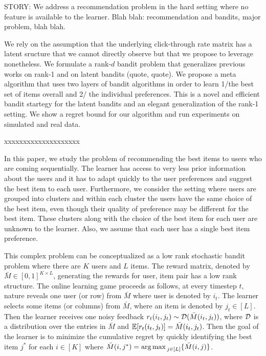 
STORY:
We address a recommendation problem in the hard setting where no feature is available to the learner.
Blah blah: recommendation and bandits, major problem, blah blah.


We rely on the assumption that the underlying click-through rate matrix has a latent sructure
that we cannot directly observe but that we propose to leverage nonetheless.
We formulate a rank-$d$ bandit problem that generalizes previous works on rank-1 and on latent bandits (quote, quote).
We propose a meta algorithm that uses two layers of bandit algorithms  in order to learn 1/the best set of items overall and 2/ the individual preferences.
This is a novel and efficient bandit startegy for the latent bandits and an elegant generalization of the rank-1 setting.
We show a regret bound for our algorithm and run experiments on simulated and real data.

xxxxxxxxxxxxxxxxxxxx





In this paper, we study the problem of recommending the best items to users who are coming sequentially. The learner has access to very less prior information about the users and it has to adapt quickly to the user preferences and suggest the best item to each user. Furthermore, we consider the setting where users are grouped into clusters and within each cluster the users have the same choice of the best item, even though their quality of preference may be different for the best item. These clusters along with the choice of the best item for each user are unknown to the learner.  Also, we assume that each user has a single best item preference.

	This complex problem can be conceptualized as a low rank stochastic bandit problem where there are $K$ users and $L$ items. The reward matrix, denoted by $\bar{M}\in [0,1]^{K\times L}$,  generating the rewards for user, item pair has a low rank structure. The online learning game proceeds as follows, at every timestep $t$,  nature reveals one user (or row) from $\bar{M}$ where user is denoted by $i_t$. The learner selects some items (or columns) from $\bar{M}$, where an item is denoted by $j_t\in [L]$. Then the learner receives one noisy feedback $r_{t}(i_t,j_t)\sim \mathcal{D}(\bar{M}(i_t,j_t))$, where $\mathcal{D}$ is a distribution over the entries in $\bar{M}$ and $\mathbb{E}[r_{t}(i_t,j_t)] = \bar{M}(i_t,j_t)$. Then the goal of the learner is to minimize the cumulative regret by quickly identifying the best item $j^*$ for each $i\in [K]$ where $\bar{M}(i,j^*) = \operatorname*{arg\,max\,} _{j\in[L]}\lbrace \bar{M}(i,j) \rbrace$.
